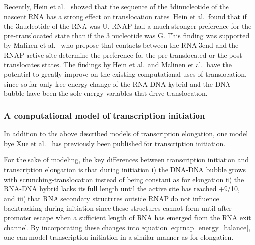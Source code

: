 Recently, Hein et al.\ \cite{hein_rna_2011} showed that the sequence of the
3\ppp dinucleotide of the nascent RNA has a strong effect on translocation
rates.  Hein et al.\ found that if the 3\ppp nucleotide of the RNA was U, RNAP
had a much stronger preference for the pre-translocated state than if the 3\ppp
nucleotide was G. This finding was supported by Malinen et al.\
\cite{malinen_active_2012} who propose that contacts between the RNA 3\ppp end
and the RNAP active site determine the preference for the pre-translocated or
the post-translocates states. The findings by Hein et al.\ and Malinen et al.\
have the potential to greatly improve on the existing computational uses of
translocation, since so far only free energy change of the RNA-DNA hybrid
and the DNA bubble have been the sole energy variables that drive translocation.

\subsubsection{A computational model of transcription initiation}
In addition to the above described models of transcription elongation, one
model bye Xue et al.\ \cite{xue_kinetic_2008} has previously been published for
transcription initiation.

For the sake of modeling, the key differences between transcription initiation
and transcription elongation is that during initiation i) the DNA-DNA
bubble grows with scrunching-translocation instead of being constant as for
elongation ii) the RNA-DNA hybrid lacks its full length until
the active site has reached +9/10, and iii) that RNA secondary structures
outside RNAP do not influence backtracking during initiation since these
structures cannot form until after promoter escape when a sufficient length of
RNA has emerged from the RNA exit channel. By incorporating these changes into
equation \eqref{eq:rnap_energy_balance}, one can model transcription initiation
in a similar manner as for elongation.

